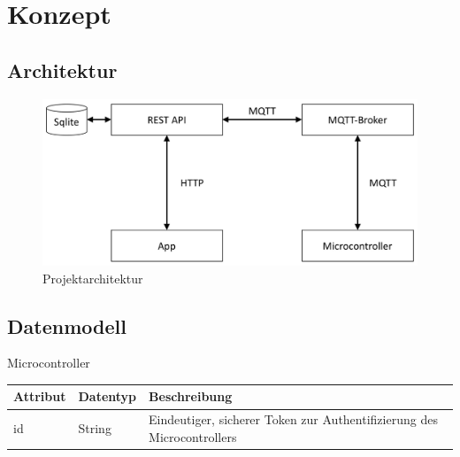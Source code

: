 \section{Konzept}
    \subsection{Architektur}
    \begin{figure}[H]
        \centering
        \includegraphics[width=0.7\linewidth]{../Pictures/Konzept/Architecture}
        \caption{Projektarchitektur}
        \label{fig:architecture}
    \end{figure}
    
    \subsection{Datenmodell}
    
     \begin{minipage}{\textwidth}
        Microcontroller\\
        \begin{tabularx}{\linewidth}{|l|l|X|}
            \hline
            Attribut & Datentyp & Beschreibung\\
            \hline
            id & String & Eindeutiger, sicherer Token zur Authentifizierung des Microcontrollers \\
            \hline                              
        \end{tabularx}
    \end{minipage}

\vspace{0.5cm}

